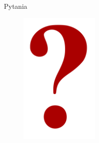\documentclass[xcolor=dvipsnames]{beamer}
\begin{document}
\begin{frame}{Pytania}
  \begin{figure}
    \includegraphics[width=0.35\textwidth]{img/question-mark-red.png}
  \end{figure}
\end{frame}
\end{document}
